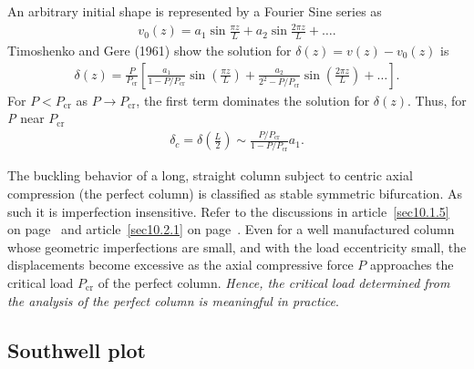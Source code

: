 \documentclass{AeroStructure-ERJohnson}
\begin{document}
An arbitrary initial shape is represented by a Fourier Sine series as
\begin{align}\label{eq11.86}
v_{0}(z)=a_{1} \sin \frac{\pi z}{L}+a_{2} \sin \frac{2 \pi z}{L}+\ldots.
\end{align}
Timoshenko and Gere (1961) show the solution for $\delta(z)=v(z)-v_{0}(z)$ is
\begin{align}\label{eq11.87}
\delta(z)=\frac{P}{P_{\mathrm{cr}}}\left[\frac{a_{1}}{1-P/P_{\mathrm{cr}}} \sin \left(\frac{\pi z}{L}\right)+\frac{a_{2}}{2^{2}-P/P_{\mathrm{cr}}} \sin \left(\frac{2 \pi z}{L}\right)+\ldots\right].
\end{align}
For $P<P_{\mathrm{cr}}$ as $P \rightarrow P_{\mathrm{cr}}$, the first term dominates the solution for $\delta(z)$. Thus, for \textit{P} near $P_{\textrm{cr}}$
\begin{align}\label{eq11.88}
\delta_{c}=\delta\left(\frac{L}{2}\right) \sim \frac{P/P_{\textrm{cr}}}{1-P/P_{\textrm{cr}}} a_{1}.
\end{align}

\vspace*{-1pc}

The buckling behavior of a long, straight column subject to centric axial compression (the perfect column) is classified as stable symmetric bifurcation. As such it is imperfection insensitive. Refer to the discussions in article~\ref{sec10.1.5} on page~\pageref{sec10.1.5} and article~\ref{sec10.2.1} on page~\pageref{sec10.2.1}. Even for a well manufactured column whose geometric imperfections are small, and with the load eccentricity small, the displacements become excessive as the axial compressive force $P$ approaches the critical load $P_{\textrm{cr}}$ of the perfect column. \textit{Hence, the critical load determined from the analysis of the perfect column is meaningful in practice}\vadjust{\vspace*{8pt}\pagebreak}.

\subsection{Southwell plot}\label{sec11.4.1}
\end{document}
